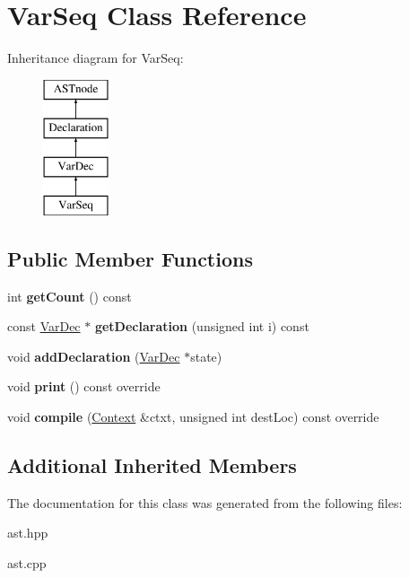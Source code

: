 \hypertarget{class_var_seq}{}\section{Var\+Seq Class Reference}
\label{class_var_seq}
Inheritance diagram for Var\+Seq\+:\begin{figure}[H]
\begin{center}
\leavevmode
\includegraphics[height=4.000000cm]{class_var_seq}
\end{center}
\end{figure}
\subsection*{Public Member Functions}
\begin{DoxyCompactItemize}
\item 
\mbox{\label{class_var_seq_a9b59c03ffa6b921bec75407d6d1818e6}} 
int {\bfseries get\+Count} () const
\item 
\mbox{\label{class_var_seq_a291c63b445d855620158e79adca53ef6}} 
const \hyperlink{class_var_dec}{Var\+Dec} $\ast$ {\bfseries get\+Declaration} (unsigned int i) const
\item 
\mbox{\label{class_var_seq_af981463560dcf565702c7e514cbabe7f}} 
void {\bfseries add\+Declaration} (\hyperlink{class_var_dec}{Var\+Dec} $\ast$state)
\item 
\mbox{\label{class_var_seq_acf8a0949a412299c55a91941d3003319}} 
void {\bfseries print} () const override
\item 
\mbox{\label{class_var_seq_aef8e8eb8d90e1729169b05620508d52a}} 
void {\bfseries compile} (\hyperlink{class_context}{Context} \&ctxt, unsigned int dest\+Loc) const override
\end{DoxyCompactItemize}
\subsection*{Additional Inherited Members}


The documentation for this class was generated from the following files\+:\begin{DoxyCompactItemize}
\item 
ast.\+hpp\item 
ast.\+cpp\end{DoxyCompactItemize}
